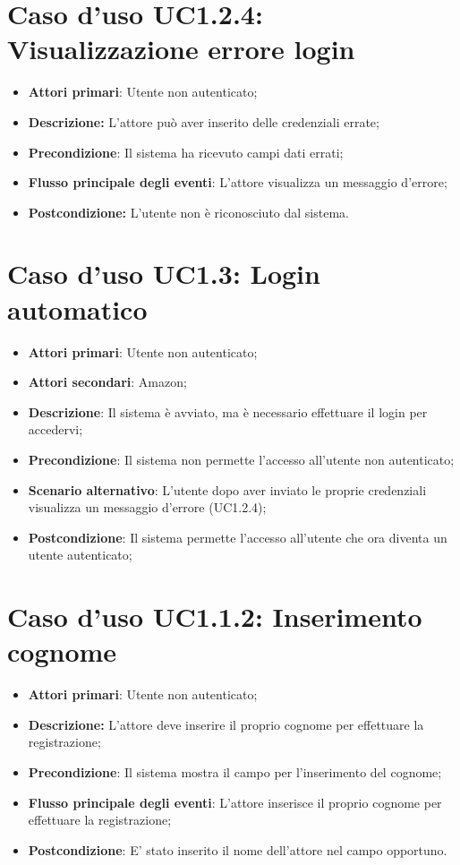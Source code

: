 	\section{Caso d'uso UC1.2.4: Visualizzazione errore login}
		\begin{itemize}
			\item \textbf{Attori primari}: Utente non autenticato;
			\item \textbf{Descrizione:} L'attore può aver inserito delle credenziali errate;
			\item \textbf{Precondizione}: Il sistema ha ricevuto campi dati errati;
			\item \textbf{Flusso principale degli eventi}: L'attore visualizza un messaggio d'errore;
			\item \textbf{Postcondizione:} L'utente non è riconosciuto dal sistema.
		\end{itemize}
	\section{Caso d'uso UC1.3: Login automatico}
	\begin{itemize}
		\item \textbf{Attori primari}: Utente non autenticato;
		\item \textbf{Attori secondari}: Amazon;
		\item \textbf{Descrizione}: Il sistema è avviato, ma è necessario effettuare il login per accedervi;
		\item \textbf{Precondizione}: Il sistema non permette l'accesso all'utente non autenticato;
		\item \textbf{Scenario alternativo}: L'utente dopo aver inviato le proprie credenziali visualizza un messaggio d'errore (UC1.2.4);
		\item \textbf{Postcondizione}: Il sistema permette l'accesso all'utente che ora diventa un utente autenticato; 
		\end{itemize}
		\section{Caso d'uso UC1.1.2: Inserimento cognome}
		\begin{itemize}
			\item \textbf{Attori primari}: Utente non autenticato;
			\item \textbf{Descrizione:} L'attore deve inserire il proprio cognome per effettuare la registrazione;
			\item \textbf{Precondizione}: Il sistema mostra il campo per l'inserimento del cognome;
			\item \textbf{Flusso principale degli eventi}: L'attore inserisce il proprio cognome per effettuare la registrazione;
			\item \textbf{Postcondizione}: E' stato inserito il nome dell'attore nel campo opportuno.
		\end{itemize}
